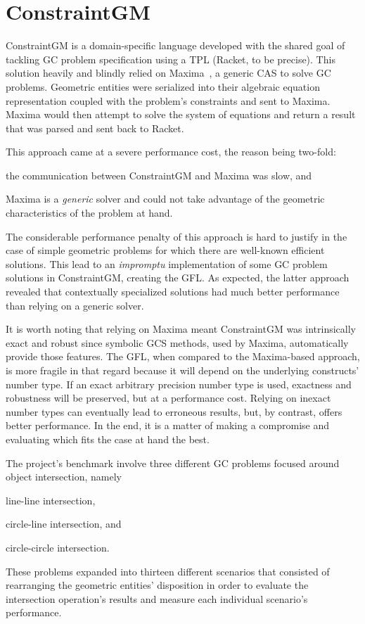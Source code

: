 \section{ConstraintGM}%
\label{sec:eval.cgm}

ConstraintGM is a domain-specific language developed with the shared goal of
tackling \ac{GC} problem specification using a \ac{TPL} (Racket, to be precise).
This solution heavily and blindly relied on Maxima~\cite{Maxima:2021:Maxima}, a
generic \ac{CAS} to solve \ac{GC} problems.  Geometric entities were serialized
into their algebraic equation representation coupled with the problem's
constraints and sent to Maxima.  Maxima would then attempt to solve the system
of equations and return a result that was parsed and sent back to Racket.

This approach came at a severe performance cost, the reason being two-fold:
\begin{enumerate*}[label= (\arabic*)]
  \item the communication between ConstraintGM and Maxima was slow, and
  \item Maxima is a \emph{generic} solver and could not take advantage of the
  geometric characteristics of the problem at hand.
\end{enumerate*}
The considerable performance penalty of this approach is hard to justify in the
case of simple geometric problems for which there are well-known efficient
solutions. This lead to an \textit{impromptu} implementation of some \ac{GC}
problem solutions in ConstraintGM, creating the \ac{GFL}. As expected, the
latter approach revealed that contextually specialized solutions had much better
performance than relying on a generic solver.

It is worth noting that relying on Maxima meant ConstraintGM was intrinsically
exact and robust since symbolic \ac{GCS} methods, used by Maxima, automatically
provide those features.  The \ac{GFL}, when compared to the Maxima-based
approach, is more fragile in that regard because it will depend on the
underlying constructs' number type.  If an exact arbitrary precision number type
is used, exactness and robustness will be preserved, but at a performance cost.
Relying on inexact number types can eventually lead to erroneous results, but,
by contrast, offers better performance.  In the end, it is a matter of making a
compromise and evaluating which fits the case at hand the best.

The project's benchmark involve three different \ac{GC} problems focused around
object intersection, namely
\begin{enumerate*}[label= (\arabic*)]
  \item line-line intersection,
  \item circle-line intersection, and
  \item circle-circle intersection.
\end{enumerate*}
These problems expanded into thirteen different scenarios that consisted of
rearranging the geometric entities' disposition in order to evaluate the
intersection operation's results and measure each individual scenario's
performance.

